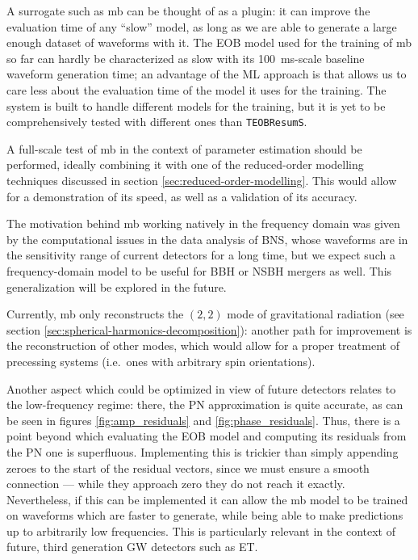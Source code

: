 \documentclass[main.tex]{subfiles}
\begin{document}
A surrogate such as \ac{mb} can be thought of as a plugin: it can improve the evaluation time of any ``slow'' model, as long as we are able to generate a large enough dataset of waveforms with it. 
The \ac{EOB} model used for the training of \ac{mb} so far can hardly be characterized as slow with its \SI{100}{ms}-scale baseline waveform generation time; an advantage of the \ac{ML} approach is that allows us to care less about the evaluation time of the model it uses for the training. 
The system is built to handle different models for the training, but it is yet to be comprehensively tested with different ones than \texttt{TEOBResumS}.

A full-scale test of \ac{mb} in the context of parameter estimation should be performed, ideally combining it with one of the reduced-order modelling techniques discussed in section \ref{sec:reduced-order-modelling}.
This would allow for a demonstration of its speed, as well as a validation of its accuracy.

The motivation behind \ac{mb} working natively in the frequency domain was given by the computational issues in the data analysis of \ac{BNS}, whose waveforms are in the sensitivity range of current detectors for a long time, but we expect such a frequency-domain model to be useful for \ac{BBH} or \ac{NSBH} mergers as well.
This generalization will be explored in the future.

Currently, \ac{mb} only reconstructs the \((2, 2)\) mode of gravitational radiation (see section \ref{sec:spherical-harmonics-decomposition}): another path for improvement is the reconstruction of other modes, which would allow for a proper treatment of precessing systems (i.e.\ ones with arbitrary spin orientations). 

Another aspect which could be optimized in view of future detectors relates to the low-frequency regime: there, the \ac{PN} approximation is quite accurate, as can be seen in figures \ref{fig:amp_residuals} and \ref{fig:phase_residuals}. 
Thus, there is a point beyond which evaluating the \ac{EOB} model and computing its residuals from the \ac{PN} one is superfluous. 
Implementing this is trickier than simply appending zeroes to the start of the residual vectors, since we must ensure a smooth connection --- while they approach zero they do not reach it exactly. 
Nevertheless, if this can be implemented it can allow the \ac{mb} model to be trained on waveforms which are faster to generate, while being able to make predictions up to arbitrarily low frequencies.
This is particularly relevant in the context of future, third generation \ac{GW} detectors such as \ac{ET}.

\end{document}
